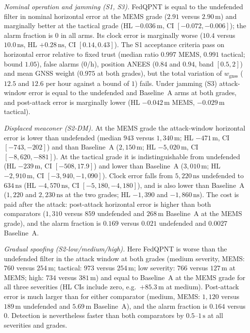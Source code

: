 \documentclass[journal]{IEEEtran}
\begin{document}
\emph{Nominal operation and jamming (S1, S3).} FedQPNT is equal to the undefended filter in nominal horizontal error at the MEMS grade ($2.91$ versus $2.90\,\mathrm{m}$) and marginally better at the tactical grade (HL $-0.036\,\mathrm{m}$, CI $[-0.072,-0.006]$); the alarm fraction is $0$ in all arms. Its clock error is marginally worse ($10.4$ versus $10.0\,\mathrm{ns}$, HL $+0.28\,\mathrm{ns}$, CI $[0.14, 0.43]$). The S1 acceptance criteria pass on horizontal error relative to fixed trust (median ratio $0.997$ MEMS, $0.991$ tactical; bound $1.05$), false alarms ($0$/h), position ANEES ($0.84$ and $0.94$, band $[0.5, 2]$) and mean GNSS weight ($0.975$ at both grades), but the total variation of $w_{\mathrm{gnss}}$ ($12.5$ and $12.6$ per hour against a bound of $1$) fails. Under jamming (S3) attack-window error is equal to the undefended and Baseline~A arms at both grades, and post-attack error is marginally lower (HL $-0.042\,\mathrm{m}$ MEMS, $-0.029\,\mathrm{m}$ tactical).

\emph{Displaced meaconer (S2-DM).} At the MEMS grade the attack-window horizontal error is lower than undefended (median $943$ versus $1{,}340\,\mathrm{m}$; HL $-471\,\mathrm{m}$, CI $[-743,-202]$) and than Baseline~A ($2{,}150\,\mathrm{m}$; HL $-5{,}020\,\mathrm{m}$, CI $[-8{,}620,-881]$). At the tactical grade it is indistinguishable from undefended (HL $-239\,\mathrm{m}$, CI $[-508, 17.9]$) and lower than Baseline~A ($3{,}010\,\mathrm{m}$; HL $-2{,}910\,\mathrm{m}$, CI $[-3{,}940,-1{,}090]$). Clock error falls from $5{,}220\,\mathrm{ns}$ undefended to $634\,\mathrm{ns}$ (HL $-4{,}570\,\mathrm{ns}$, CI $[-5{,}180,-4{,}180]$), and is also lower than Baseline~A ($1{,}220$ and $2{,}230\,\mathrm{ns}$ at the two grades; HL $-1{,}390$ and $-1{,}860\,\mathrm{ns}$). The cost is paid after the attack: post-attack horizontal error is higher than both comparators ($1{,}310$ versus $859$ undefended and $268\,\mathrm{m}$ Baseline~A at the MEMS grade), and the alarm fraction is $0.169$ versus $0.021$ undefended and $0.0027$ Baseline~A.

\emph{Gradual spoofing (S2-low/medium/high).} Here FedQPNT is worse than the undefended filter in the attack window at both grades (medium severity, MEMS: $760$ versus $254\,\mathrm{m}$; tactical: $973$ versus $254\,\mathrm{m}$; low severity: $766$ versus $127\,\mathrm{m}$ at MEMS; high: $734$ versus $381\,\mathrm{m}$) and equal to Baseline~A at the MEMS grade for all three severities (HL CIs include zero, e.g.\ $+85.3\,\mathrm{m}$ at medium). Post-attack error is much larger than for either comparator (medium, MEMS: $1{,}120$ versus $189\,\mathrm{m}$ undefended and $5.69\,\mathrm{m}$ Baseline~A), and the alarm fraction is $0.164$ versus $0$. Detection is nevertheless faster than both comparators by $0.5$--$1\,\mathrm{s}$ at all severities and grades.
\end{document}
